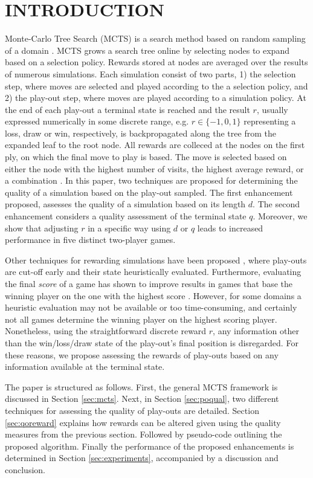 \documentclass{ecai2014}
\begin{document}
\section{INTRODUCTION}
\label{sec:intro}
Monte-Carlo Tree Search (MCTS) is a search method based on random sampling of a domain \cite{coulom2007efficient,kocsis2006bandit}. MCTS grows a search tree online by selecting nodes to expand based on a selection policy. Rewards stored at nodes are averaged over the results of numerous simulations. Each simulation consist of two parts, 1) the selection step, where moves are selected and played according to the a selection policy, and 2) the play-out step, where moves are played according to a simulation policy. At the end of each play-out a terminal state is reached and the result $r$, usually expressed numerically in some discrete range, e.g. $r \in \{-1, 0, 1\}$ representing a loss, draw or win, respectively, is backpropagated along the tree from the expanded leaf to the root node. All rewards are colleced at the nodes on the first ply, on which the final move to play is based. The move is selected based on either the node with the highest number of visits, the highest average reward, or a combination \cite{chaslot2008progressive}. In this paper, two techniques are proposed for determining the quality of a simulation based on the play-out sampled. The first enhancement proposed, assesses the quality of a simulation based on its length $d$. The second enhancement considers a quality assessment of the terminal state $q$. Moreover, we show that adjusting $r$ in a specific way using  $d$ or $q$ leads to increased performance in five distinct two-player games.

Other techniques for rewarding simulations have been proposed \cite{Winands2011}, where play-outs are cut-off early and their state heuristically evaluated. Furthermore, evaluating the final \emph{score} of a game has shown to improve results in games that base the winning player on the one with the highest score \cite{shibahara2008combining}. However, for some domains a heuristic evaluation may not be available or too time-consuming, and certainly not all games determine the winning player on the highest scoring player. Nonetheless, using the straightforward discrete reward $r$, any information other than the win/loss/draw state of the play-out's final position is disregarded. For these reasons, we propose assessing the rewards of play-outs based on any information available at the terminal state.

The paper is structured as follows. First, the general MCTS framework is discussed in Section \ref{sec:mcts}. Next, in Section \ref{sec:poqual}, two different techniques for assessing the quality of play-outs are detailed. Section \ref{sec:qoreward} explains how rewards can be altered given using the quality measures from the previous section. Followed by pseudo-code outlining the proposed algorithm. Finally the performance of the proposed enhancements is determined in Section \ref{sec:experiments}, accompanied by a discussion and conclusion.
\end{document}
